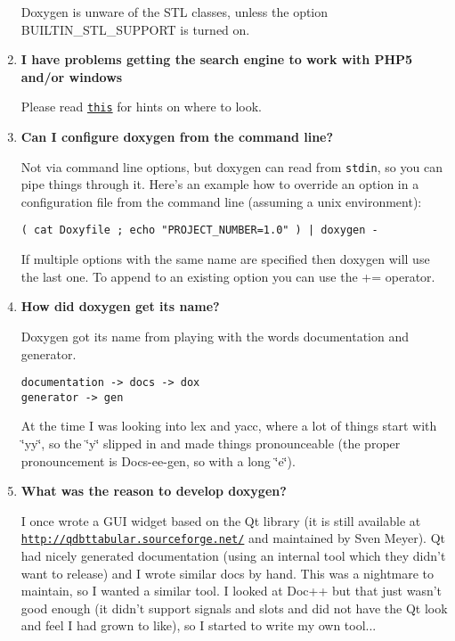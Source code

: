 \begin{enumerate}
Doxygen is unware of the STL classes, unless the option BUILTIN\_\-STL\_\-SUPPORT is turned on.

\item {\bf I have problems getting the search engine to work with PHP5 and/or windows}

Please read \href{searchengine.html}{\tt this} for hints on where to look.

\item {\bf Can I configure doxygen from the command line?}

Not via command line options, but doxygen can read from {\tt stdin}, so you can pipe things through it. Here's an example how to override an option in a configuration file from the command line (assuming a unix environment):



\footnotesize\begin{verbatim}
( cat Doxyfile ; echo "PROJECT_NUMBER=1.0" ) | doxygen -
\end{verbatim}
\normalsize


If multiple options with the same name are specified then doxygen will use the last one. To append to an existing option you can use the += operator.

\item {\bf How did doxygen get its name?}

Doxygen got its name from playing with the words documentation and generator.



\footnotesize\begin{verbatim}
documentation -> docs -> dox
generator -> gen
\end{verbatim}
\normalsize


At the time I was looking into lex and yacc, where a lot of things start with \char`\"{}yy\char`\"{}, so the \char`\"{}y\char`\"{} slipped in and made things pronounceable (the proper pronouncement is Docs-ee-gen, so with a long \char`\"{}e\char`\"{}).

\item {\bf What was the reason to develop doxygen?}

I once wrote a GUI widget based on the Qt library (it is still available at \href{http://qdbttabular.sourceforge.net/}{\tt http://qdbttabular.sourceforge.net/} and maintained by Sven Meyer). Qt had nicely generated documentation (using an internal tool which they didn't want to release) and I wrote similar docs by hand. This was a nightmare to maintain, so I wanted a similar tool. I looked at Doc++ but that just wasn't good enough (it didn't support signals and slots and did not have the Qt look and feel I had grown to like), so I started to write my own tool...

\end{enumerate}


 